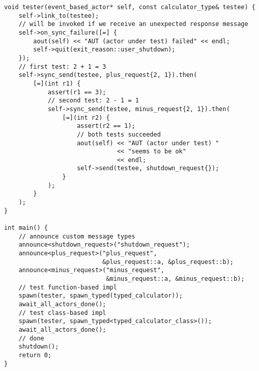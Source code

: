 \clearpage
\begin{lstlisting}
void tester(event_based_actor* self, const calculator_type& testee) {
    self->link_to(testee);
    // will be invoked if we receive an unexpected response message
    self->on_sync_failure([=] {
        aout(self) << "AUT (actor under test) failed" << endl;
        self->quit(exit_reason::user_shutdown);
    });
    // first test: 2 + 1 = 3
    self->sync_send(testee, plus_request{2, 1}).then(
        [=](int r1) {
            assert(r1 == 3);
            // second test: 2 - 1 = 1
            self->sync_send(testee, minus_request{2, 1}).then(
                [=](int r2) {
                    assert(r2 == 1);
                    // both tests succeeded
                    aout(self) << "AUT (actor under test) "
                               << "seems to be ok"
                               << endl;
                    self->send(testee, shutdown_request{});
                }
            );
        }
    );
}

int main() {
    // announce custom message types
    announce<shutdown_request>("shutdown_request");
    announce<plus_request>("plus_request",
                           &plus_request::a, &plus_request::b);
    announce<minus_request>("minus_request",
                            &minus_request::a, &minus_request::b);
    // test function-based impl
    spawn(tester, spawn_typed(typed_calculator));
    await_all_actors_done();
    // test class-based impl
    spawn(tester, spawn_typed<typed_calculator_class>());
    await_all_actors_done();
    // done
    shutdown();
    return 0;
}
\end{lstlisting}
